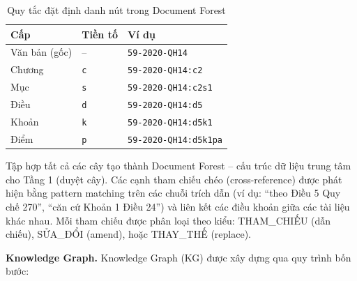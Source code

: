\begin{table}[htbp]
  \centering
  \caption{Quy tắc đặt định danh nút trong Document Forest}
  \label{tab:node-identifier-rules}
  \begin{tabular}{lll}
    \toprule
    \textbf{Cấp} & \textbf{Tiền tố} & \textbf{Ví dụ} \\
    \midrule
    Văn bản (gốc) & -- & \texttt{59-2020-QH14} \\
    Chương        & \texttt{c} & \texttt{59-2020-QH14:c2} \\
    Mục           & \texttt{s} & \texttt{59-2020-QH14:c2s1} \\
    Điều          & \texttt{d} & \texttt{59-2020-QH14:d5} \\
    Khoản         & \texttt{k} & \texttt{59-2020-QH14:d5k1} \\
    Điểm          & \texttt{p} & \texttt{59-2020-QH14:d5k1pa} \\
    \bottomrule
  \end{tabular}
\end{table}

Tập hợp tất cả các cây tạo thành Document Forest -- cấu trúc dữ liệu trung tâm
cho Tầng 1 (duyệt cây). Các cạnh tham chiếu chéo (cross-reference) được phát hiện
bằng pattern matching trên các chuỗi trích dẫn (ví dụ: ``theo Điều 5 Quy chế
270'', ``căn cứ Khoản 1 Điều 24'') và liên kết các điều khoản giữa các tài liệu
khác nhau. Mỗi tham chiếu được phân loại theo kiểu: THAM\_CHIẾU (dẫn chiếu),
SỬA\_ĐỔI (amend), hoặc THAY\_THẾ (replace).

\textbf{Knowledge Graph.}
Knowledge Graph (KG) được xây dựng qua quy trình bốn bước:

